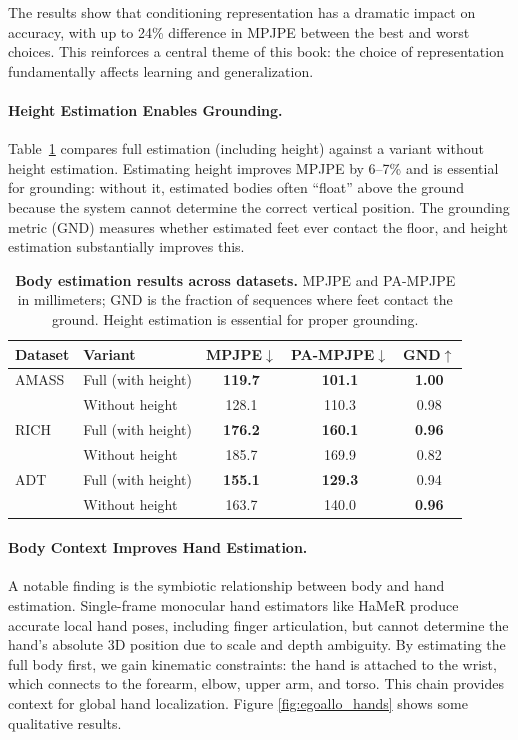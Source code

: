 \documentclass[../../book-main.tex]{subfiles}
\begin{document}
The results show that conditioning representation has a dramatic
impact on accuracy, with up to 24\% difference in MPJPE between the
best and worst choices. This reinforces a central theme of this book:
the choice of representation fundamentally affects learning and generalization.

\paragraph{Height Estimation Enables Grounding.}
Table~\ref{tab:egoallo_body_results} compares full estimation
(including height) against a variant without height estimation.
Estimating height improves MPJPE by 6--7\% and is essential for
grounding: without it, estimated bodies often ``float'' above the
ground because the system cannot determine the correct vertical
position. The grounding metric (GND) measures whether estimated feet
ever contact the floor, and height estimation substantially improves this.

\begin{table}[t]
\centering
\caption{\textbf{Body estimation results across datasets.} MPJPE
and PA-MPJPE in millimeters; GND is the fraction of sequences
where feet contact the ground. Height estimation is essential for
proper grounding.}
\label{tab:egoallo_body_results}
\small
\begin{tabular}{llccc}
\toprule
\textbf{Dataset} & \textbf{Variant} &
\textbf{MPJPE}$\downarrow$ & \textbf{PA-MPJPE}$\downarrow$ &
\textbf{GND}$\uparrow$ \\
\midrule
AMASS & Full (with height) & \textbf{119.7} & \textbf{101.1}
& \textbf{1.00} \\
& Without height & 128.1 & 110.3 & 0.98 \\
\midrule
RICH  & Full (with height) & \textbf{176.2} & \textbf{160.1}
& \textbf{0.96} \\
& Without height & 185.7 & 169.9 & 0.82 \\
\midrule
ADT   & Full (with height) & \textbf{155.1} & \textbf{129.3} & 0.94 \\
& Without height & 163.7 & 140.0 & \textbf{0.96} \\
\bottomrule
\end{tabular}
\end{table}

\paragraph{Body Context Improves Hand Estimation.}
A notable finding is the symbiotic relationship between body and hand
estimation. Single-frame monocular hand estimators like HaMeR produce
accurate local hand poses, including finger articulation, but cannot
determine the hand's absolute 3D position due to scale and depth
ambiguity. By estimating the full body first, we gain kinematic
constraints: the hand is attached to the wrist, which connects to the
forearm, elbow, upper arm, and torso. This chain provides context for
global hand localization. Figure \ref{fig:egoallo_hands} shows some
qualitative results.
\end{document}
